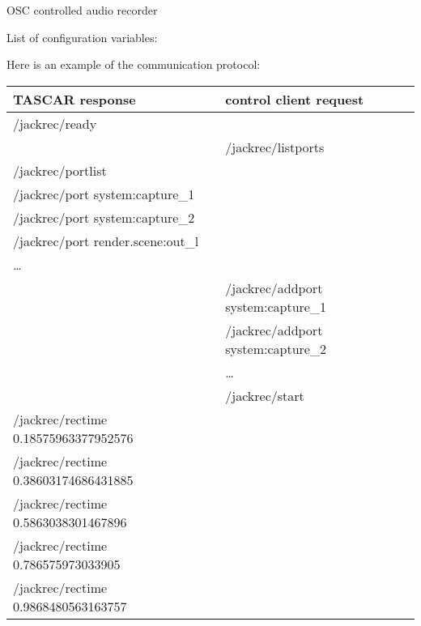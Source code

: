 OSC controlled audio recorder


List of configuration variables:



Here is an example of the communication protocol:

\begin{tabular}{|l|l|}
  \hline
  TASCAR response                                 & control client request             \\
  \hline
  \hline
  /jackrec/ready                                  &                                    \\
  \hline
                                                  & /jackrec/listports                 \\
  \hline
  /jackrec/portlist                               &                                    \\
  /jackrec/port system:capture\_1                 &                                    \\
  /jackrec/port system:capture\_2                 &                                    \\
  /jackrec/port render.scene:out\_l               &                                    \\
  \dots                                           &                                    \\
  \hline
                                                  & /jackrec/addport system:capture\_1 \\
                                                  & /jackrec/addport system:capture\_2 \\
                                                  & \dots                              \\
  \hline
                                                  & /jackrec/start                     \\
  \hline
  /jackrec/rectime 0.18575963377952576            &                                    \\
  /jackrec/rectime 0.38603174686431885            &                                    \\
  /jackrec/rectime 0.5863038301467896             &                                    \\
  /jackrec/rectime 0.786575973033905              &                                    \\
  /jackrec/rectime 0.9868480563163757             &                                    \\

\end{tabular}
